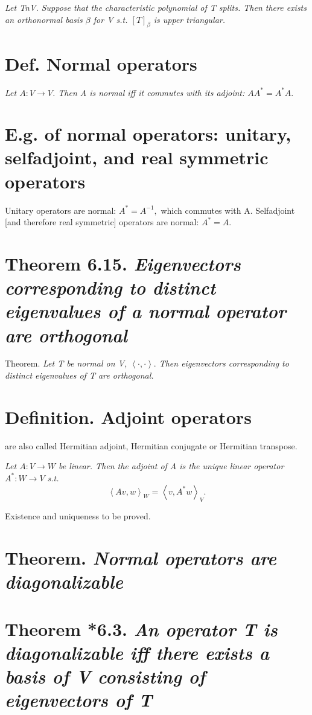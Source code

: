 \documentclass[12pt,english]{article}
\begin{document}
\emph{Let TnV. Suppose that the characteristic polynomial of T splits.
Then there exists an orthonormal basis $\beta$ for V s.t. $[T]_{\beta}$
is upper triangular.}

\section{Def. Normal operators}

\emph{Let $A:V\longrightarrow V$. Then A is normal iff it commutes
with its adjoint: $AA^{*}=A^{*}A.$}

\section{E.g. of normal operators: unitary, selfadjoint, and real symmetric
operators}

Unitary operators are normal: $A^{*}=A^{-1},$ which commutes with
A. Selfadjoint {[}and therefore real symmetric{]} operators are normal:
$A^{*}=A.$

\section{Theorem 6.15. \emph{Eigenvectors corresponding to distinct eigenvalues
of a normal operator are orthogonal}}

Theorem. \emph{Let T be normal on V, $\left\langle \cdot,\cdot\right\rangle .$
Then eigenvectors corresponding to distinct eigenvalues of T are orthogonal.}

\section{Definition. Adjoint operators}

are also called Hermitian adjoint, Hermitian conjugate or Hermitian
transpose.

\emph{Let $A:V\longrightarrow W$ be linear. Then the adjoint of A
is the unique linear operator $A^{*}:W\longrightarrow V$ s.t.
\[
\left\langle Av,w\right\rangle _{W}=\left\langle v,A^{*}w\right\rangle _{V}.
\]
}

Existence and uniqueness to be proved.

\section{Theorem. \emph{Normal operators are diagonalizable}}

\section{Theorem {*}6.3. \emph{An operator T is diagonalizable iff there exists
a basis of V consisting of eigenvectors of T}}
\end{document}
